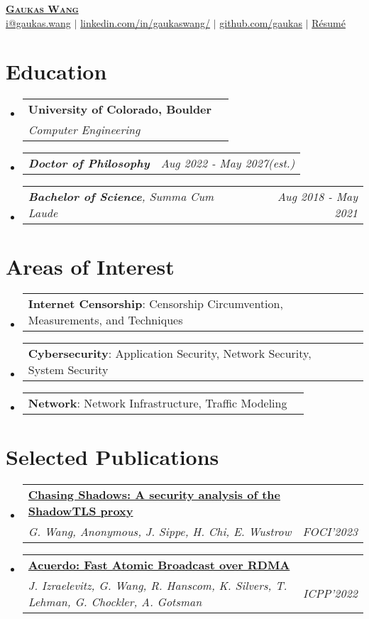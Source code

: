 \documentclass[letterpaper,11pt]{article}
\makeatletter
\newcommand{\resumeSubheading}[4]{
  \vspace{-2pt}\item
    \begin{tabular*}{0.97\textwidth}[t]{l@{\extracolsep{\fill}}r}
      \textbf{#1} & #2 \\
      \textit{\small#3} & \textit{\small #4} \\
    \end{tabular*}\vspace{-7pt}
}
\newcommand{\resumeSubSubheading}[2]{
    \item
    \begin{tabular*}{0.97\textwidth}{l@{\extracolsep{\fill}}r}
      \textit{\small#1} & \textit{\small #2} \\
    \end{tabular*}\vspace{-7pt}
}
\newcommand{\resumeProjectHeading}[2]{
    \item
    \begin{tabular*}{0.97\textwidth}{l@{\extracolsep{\fill}}r}
      \small#1 & #2 \\
    \end{tabular*}\vspace{-7pt}
}
\newcommand{\resumeSubHeadingListStart}{\begin{itemize}[leftmargin=0.15in, label={}]}
\newcommand{\resumeSubHeadingListEnd}{\end{itemize}}
\makeatother
\begin{document}
\begin{center}
  \href{https://gaukas.wang}{\textbf{\Huge \scshape Gaukas Wang}} \\ \vspace{1pt}
    \href{mailto:i@gaukas.wang}{{i@gaukas.wang}} $|$ 
    \href{https://www.linkedin.com/in/gaukaswang/}{linkedin.com/in/gaukaswang/} $|$
    \href{https://github.com/gaukas}{{github.com/gaukas}} $|$ 
    \href{https://gauk.as/resume}{{Résumé}}
    
\end{center}


\section{Education}
\resumeSubHeadingListStart
\resumeSubheading
{University of Colorado, Boulder}{}
{Computer Engineering}{}
\resumeSubSubheading
{\textbf{Doctor of Philosophy}}{Aug 2022 - May 2027\textit{(est.)}}
\resumeSubSubheading
{\textbf{Bachelor of Science}, {Summa Cum Laude}}{Aug 2018 - May 2021}
\resumeSubHeadingListEnd

\vspace{1pt}

\section{Areas of Interest}
\resumeSubHeadingListStart

\resumeProjectHeading
{\textbf{Internet Censorship}: Censorship Circumvention, Measurements, and Techniques}{}

\resumeProjectHeading
{\textbf{Cybersecurity}: Application Security, Network Security, System Security}{}

\resumeProjectHeading
{\textbf{Network}: Network Infrastructure, Traffic Modeling}{}

\resumeSubHeadingListEnd
\vspace{1pt}

\section{Selected Publications}
\resumeSubHeadingListStart
  \resumeSubheading
  {\href{https://gaukas.wang/paper/foci23-wang.pdf}{\textbf{Chasing Shadows: A security analysis of the ShadowTLS proxy}}}{}
  {\emph{G. Wang, Anonymous, J. Sippe, H. Chi, E. Wustrow} }{FOCI'2023}
  \resumeSubheading
  {\href{https://gaukas.wang/paper/icpp22-izraelevitz.pdf}{\textbf{Acuerdo: Fast Atomic Broadcast over RDMA}}}{}
  {\emph{J. Izraelevitz, G. Wang, R. Hanscom, K. Silvers, T. Lehman, G. Chockler, A. Gotsman} }{ICPP'2022}
\resumeSubHeadingListEnd
\vspace{1pt}
\end{document}
